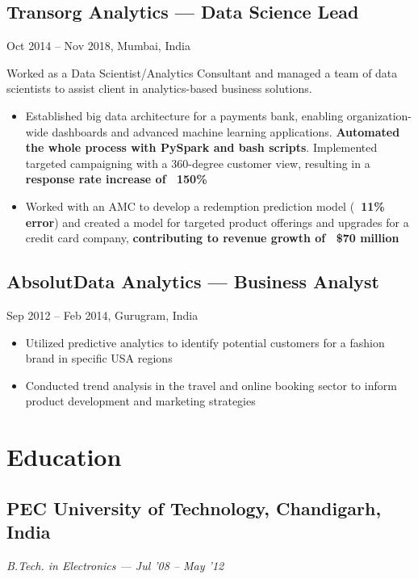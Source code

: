 \documentclass[letterpaper,10pt]{article}
\begin{document}
  \subsection*{Transorg Analytics — Data Science Lead}
  Oct 2014 – Nov 2018, Mumbai, India
  \newline {}
  
  Worked as a Data Scientist/Analytics Consultant and managed a team of data scientists to assist client in analytics-based business solutions.
  \begin{itemize}[leftmargin=1em]
      \item Established big data architecture for a payments bank, enabling organization-wide dashboards and advanced machine learning applications. \textbf{Automated the whole process with PySpark and bash scripts}. Implemented targeted campaigning with a 360-degree customer view, resulting in a \textbf{response rate increase of ~150\%}
      \item Worked with an AMC to develop a redemption prediction model (\textbf{~11\% error}) and created a model for targeted product offerings and upgrades for a credit card company, \textbf{contributing to revenue growth of ~\$70 million}
  \end{itemize}

  \subsection*{AbsolutData Analytics — Business Analyst}
  Sep 2012 – Feb 2014, Gurugram, India
  \newline {}
  
  \begin{itemize}[leftmargin=1em]
      \item Utilized predictive analytics to identify potential customers for a fashion brand in specific USA regions
      \item Conducted trend analysis in the travel and online booking sector to inform product development and marketing strategies
  \end{itemize}


  \section{Education}
  \subsection*{PEC University of Technology, Chandigarh, India}
  \textit{B.Tech. in Electronics — Jul '08 -- May '12}
\end{document}
